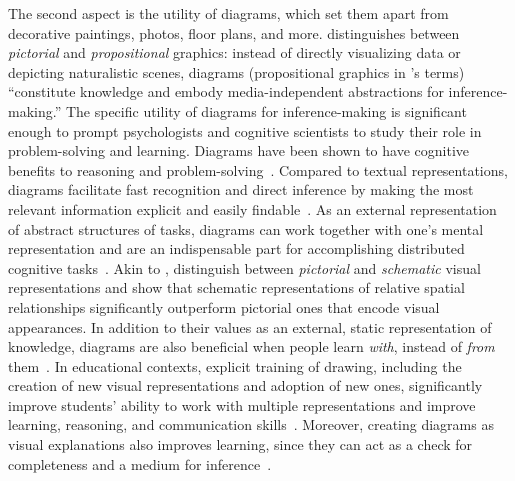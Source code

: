 The second aspect is the utility of diagrams, which set them apart from decorative paintings, photos, floor plans, and more. \citet{designWithDiagrams} distinguishes between \emph{pictorial} and \emph{propositional} graphics: instead of directly visualizing data or depicting naturalistic scenes, diagrams (propositional graphics in \citeauthor{designWithDiagrams}'s terms) ``constitute knowledge and embody media-independent abstractions for inference-making.'' The specific utility of diagrams for inference-making is significant enough to prompt psychologists and cognitive scientists to study their role in problem-solving and learning. Diagrams have been shown to have cognitive benefits to reasoning and problem-solving~\cite{whyDiagramWorth, koedinger_emergent_1992, mayer_multimedia_2002}. Compared to textual representations, diagrams facilitate fast recognition and direct inference by making the most relevant information explicit and easily findable~\cite{whyDiagramWorth}. As an external representation of abstract structures of tasks, diagrams can work together with one's mental representation and are an indispensable part for accomplishing distributed cognitive tasks~\cite{DistributedCognitive}. Akin to \citet{designingWithDiagrams}, \citet{hegarty_types_1999} distinguish between \emph{pictorial} and \emph{schematic} visual representations and show that schematic representations of relative spatial relationships significantly outperform pictorial ones that encode visual appearances.
In addition to their values as an external, static representation of knowledge, diagrams are also beneficial when people learn \emph{with}, instead of \emph{from} them~\cite{tippett_what_2016}. In educational contexts, explicit training of drawing, including the creation of new visual representations and adoption of new ones, significantly improve students' ability to work with multiple representations and improve learning, reasoning, and communication skills~\cite{ainsworth_drawing_2011}. Moreover, creating diagrams as visual explanations also improves learning, since they can act as a check for completeness and a medium for inference~\cite{bobek_creating_2016}. 


